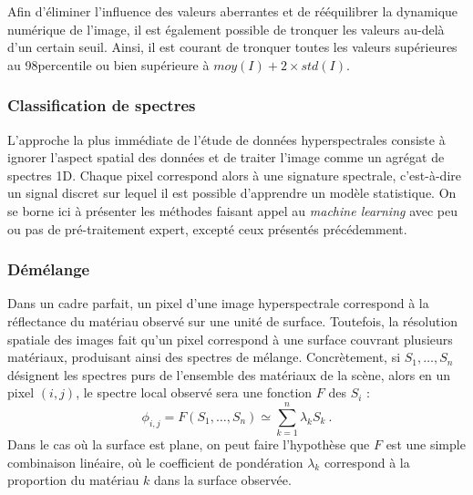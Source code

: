 Afin d'éliminer l'influence des valeurs aberrantes et de rééquilibrer la dynamique numérique de l'image, il est également possible de tronquer les valeurs au-delà d'un certain seuil. Ainsi, il est courant de tronquer toutes les valeurs supérieures au 98\ieme percentile ou bien supérieure à $moy(I) + 2\times std(I)$.

\subsubsection{Classification de spectres}

L'approche la plus immédiate de l'étude de données hyperspectrales consiste à ignorer l'aspect spatial des données et de traiter l'image comme un agrégat de spectres 1D. Chaque pixel correspond alors à une signature spectrale, c'est-à-dire un signal discret sur lequel il est possible d'apprendre un modèle statistique. On se borne ici à présenter les méthodes faisant appel au \textit{machine learning} avec peu ou pas de pré-traitement expert, excepté ceux présentés précédemment.

\subsubsection{Démélange}
Dans un cadre parfait, un pixel d'une image hyperspectrale correspond à la réflectance du matériau observé sur une unité de surface. Toutefois, la résolution spatiale des images fait qu'un pixel correspond à une surface couvrant plusieurs matériaux, produisant ainsi des spectres de mélange. Concrètement, si $S_1, \dots, S_n$ désignent les spectres purs de l'ensemble des matériaux de la scène, alors en un pixel $(i,j)$, le spectre local observé sera une fonction $F$ des $S_i$ :
$$ \phi_{i,j} = F(S_1, \dots, S_n) \simeq \sum_{k = 1}^n \lambda_k S_k~.$$
Dans le cas où la surface est plane, on peut faire l'hypothèse que $F$ est une simple combinaison linéaire, où le coefficient de pondération $\lambda_k$ correspond à la proportion du matériau $k$ dans la surface observée.

